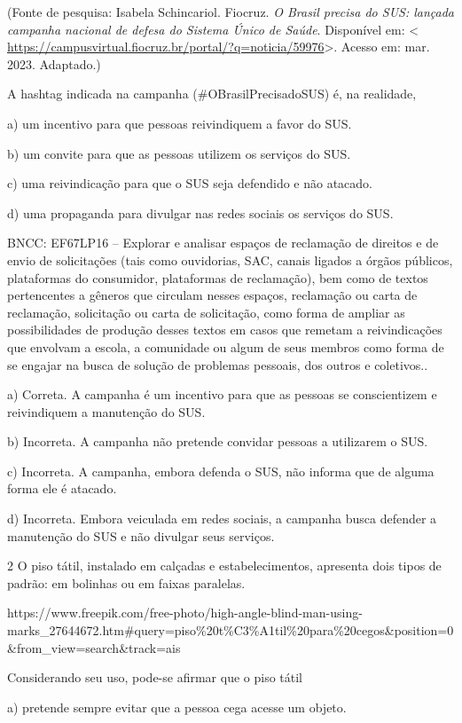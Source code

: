 {(Fonte de pesquisa: Isabela Schincariol. Fiocruz. \emph{O Brasil precisa
do SUS: lançada campanha nacional de defesa do Sistema Único de Saúde}.
Disponível em: \textless{}
\url{https://campusvirtual.fiocruz.br/portal/?q=noticia/59976}\textgreater.
Acesso em: mar. 2023. Adaptado.)

A hashtag indicada na campanha (\#OBrasilPrecisadoSUS) é, na realidade,

a) um incentivo para que pessoas reivindiquem a favor do SUS.

b) um convite para que as pessoas utilizem os serviços do SUS.

c) uma reivindicação para que o SUS seja defendido e não atacado.

d) uma propaganda para divulgar nas redes sociais os serviços do SUS.

BNCC: EF67LP16 -- Explorar e analisar espaços de reclamação de direitos
e de envio de solicitações (tais como ouvidorias, SAC, canais ligados a
órgãos públicos, plataformas do consumidor, plataformas de reclamação),
bem como de textos pertencentes a gêneros que circulam nesses espaços,
reclamação ou carta de reclamação, solicitação ou carta de solicitação,
como forma de ampliar as possibilidades de produção desses textos em
casos que remetam a reivindicações que envolvam a escola, a comunidade
ou algum de seus membros como forma de se engajar na busca de solução de
problemas pessoais, dos outros e coletivos..

a) Correta. A campanha é um incentivo para que as pessoas se
conscientizem e reivindiquem a manutenção do SUS.

b) Incorreta. A campanha não pretende convidar pessoas a utilizarem o
SUS.

c) Incorreta. A campanha, embora defenda o SUS, não informa que de
alguma forma ele é atacado.

d) Incorreta. Embora veiculada em redes sociais, a campanha busca
defender a manutenção do SUS e não divulgar seus serviços.

\num{2} O piso tátil, instalado em calçadas e estabelecimentos,
apresenta dois tipos de padrão: em bolinhas ou em faixas paralelas.

https://www.freepik.com/free-photo/high-angle-blind-man-using-marks\_27644672.htm\#query=piso\%20t\%C3\%A1til\%20para\%20cegos\&position=0\&from\_view=search\&track=ais

Considerando seu uso, pode-se afirmar que o piso tátil

a) pretende sempre evitar que a pessoa cega acesse um objeto.

}
